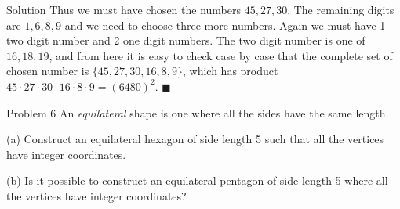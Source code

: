 \documentclass{article}
\begin{document}
\begin{solution}{Solution}
Thus we must have chosen the numbers $45, 27, 30$. The remaining digits are
$1, 6, 8, 9$ and we need to choose three more numbers. Again we must
have 1 two digit number and 2 one digit numbers. The two digit number is one of
$16, 18, 19$, and from here it is easy to check case by case that the complete
set of chosen number is $\{ 45, 27, 30, 16, 8, 9 \}$, which has product
$45\cdot 27\cdot 30\cdot 16\cdot 8\cdot 9 = (6480)^2$. $\blacksquare$
\end{solution}
\newpage

\begin{problem}{Problem 6}
An \textit{equilateral} shape is one where all the sides have the same
length.\vspace{0.2cm}

(a) Construct an equilateral hexagon of side length 5 such that all the
vertices have integer coordinates.\vspace{0.2cm}

(b) Is it possible to construct an equilateral pentagon of side length 5
where all the vertices have integer coordinates?
\end{problem}
\end{document}
